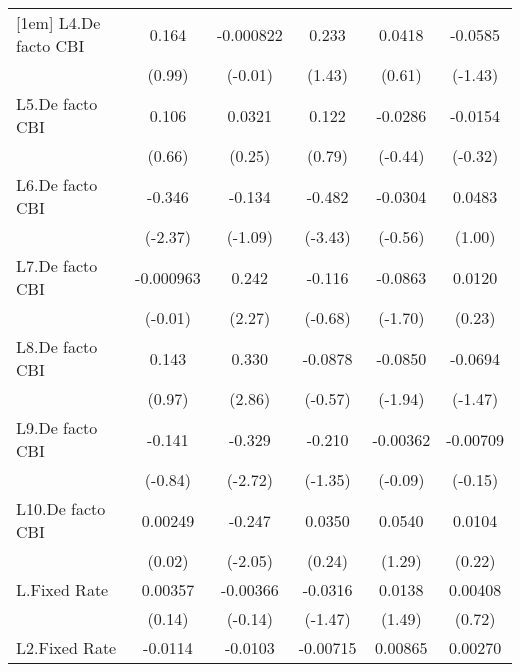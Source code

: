 {\begin{longtable}{l*{5}{c}}
[1em]
L4.De facto CBI &    0.164         &-0.000822         &    0.233         &   0.0418         &  -0.0585         \\
                &   (0.99)         &  (-0.01)         &   (1.43)         &   (0.61)         &  (-1.43)         \\
[1em]
L5.De facto CBI &    0.106         &   0.0321         &    0.122         &  -0.0286         &  -0.0154         \\
                &   (0.66)         &   (0.25)         &   (0.79)         &  (-0.44)         &  (-0.32)         \\
[1em]
L6.De facto CBI &   -0.346\sym{*}  &   -0.134         &   -0.482\sym{***}&  -0.0304         &   0.0483         \\
                &  (-2.37)         &  (-1.09)         &  (-3.43)         &  (-0.56)         &   (1.00)         \\
[1em]
L7.De facto CBI &-0.000963         &    0.242\sym{*}  &   -0.116         &  -0.0863         &   0.0120         \\
                &  (-0.01)         &   (2.27)         &  (-0.68)         &  (-1.70)         &   (0.23)         \\
[1em]
L8.De facto CBI &    0.143         &    0.330\sym{**} &  -0.0878         &  -0.0850         &  -0.0694         \\
                &   (0.97)         &   (2.86)         &  (-0.57)         &  (-1.94)         &  (-1.47)         \\
[1em]
L9.De facto CBI &   -0.141         &   -0.329\sym{**} &   -0.210         & -0.00362         & -0.00709         \\
                &  (-0.84)         &  (-2.72)         &  (-1.35)         &  (-0.09)         &  (-0.15)         \\
[1em]
L10.De facto CBI&  0.00249         &   -0.247\sym{*}  &   0.0350         &   0.0540         &   0.0104         \\
                &   (0.02)         &  (-2.05)         &   (0.24)         &   (1.29)         &   (0.22)         \\
[1em]
L.Fixed Rate    &  0.00357         & -0.00366         &  -0.0316         &   0.0138         &  0.00408         \\
                &   (0.14)         &  (-0.14)         &  (-1.47)         &   (1.49)         &   (0.72)         \\
[1em]
L2.Fixed Rate   &  -0.0114         &  -0.0103         & -0.00715         &  0.00865         &  0.00270         \\

\end{longtable}}
